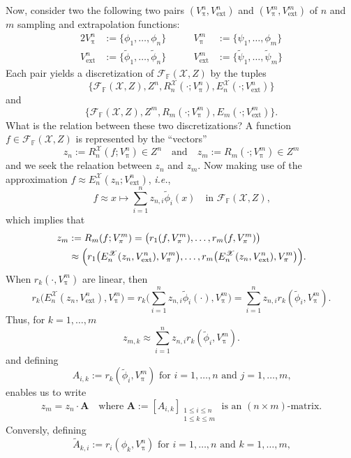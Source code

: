\documentclass[a4paper]{paper}
\newcommand{\VecSpace}[1]{\mathscr{#1}}
\newcommand{\Field}{\mathbb{F}}
\newcommand*{\EXT}[2]{\ensuremath{E_{#1}^{#2}}}
\newcommand*{\REST}[2]{\ensuremath{R_{#1}^{#2}}}
\newcommand*{\RnX}{\ensuremath{\REST{n}{\VecSpace{X}}}}
\newcommand*{\EnX}{\ensuremath{\EXT{n}{\VecSpace{X}}}}
\DeclareMathOperator{\rest}{\pi}
\newcommand{\ie}{\textsl{i.e.}\xspace}
\newcommand{\vA}{\boldsymbol{A}}
\newcommand{\cF}{\mathcal{F}}
\newcommand{\ext}{\text{ext}}
\newcommand{\wt}[1]{\widetilde{#1}}
\begin{document}
Now, consider two the following two pairs $(V^n_{\rest},V^n_{\ext})$ and 
$(V^m_{\rest},V^m_{\ext})$ of $n$ and $m$ sampling and extrapolation 
functions:
\begin{alignat*}{2}
  V^n_{\rest} &:=\{ \phi_{1},\ldots,\phi_{n} \} &\qquad
  V^m_{\rest} &:=\{ \psi_{1},\ldots,\phi_{m} \}  \\
  V^n_{\ext} &:=\{ \wt{\phi}_{1},\ldots,\wt{\phi}_{n} \} &\qquad
  V^m_{\ext} &:=\{ \wt{\psi}_{1},\ldots,\wt{\psi}_{m} \}    
\end{alignat*}
Each pair yields a discretization of $\cF_{\Field}(\VecSpace{X},Z)$ by the tuples
\[ 
   \bigl\{
     \cF_{\Field}(\VecSpace{X},Z),Z^n,\RnX(\cdot;V^n_{\rest}),\EnX(\cdot;V^n_{\ext})
   \bigr\} \]
and
\[ \bigl\{
     \cF_{\Field}(\VecSpace{X},Z),Z^m,R_{m}(\cdot;V^m_{\rest}),E_{m}(\cdot;V^m_{\ext})
   \bigr\}. \] 
What is the relation between these two discretizations? A function 
$f\in \cF_{\Field}(\VecSpace{X},Z)$ is represented by the ``vectors'' 
\[ z_{n}:= \RnX(f;V^n_{\rest})\in Z^n \quad\text{and}\quad
   z_{m}:= R_{m}(\cdot;V^m_{\rest})\in Z^m \]
and we seek the relaation between $z_{n}$ and $z_{m}$. 
Now making use of the approximation $f\approx 
\EnX(z_{n};V^n_{\ext})$, \ie,
\[ f \approx x \mapsto 
       \sum_{i=1}^n z_{n,i} \wt{\phi}_{i}(x)
   \quad\text{in $\cF_{\Field}(\VecSpace{X},Z)$,} 
\]
which implies that
\begin{align*}
  z_{m} &:=R_{m}(f;V^m_{\rest}) =
    \bigl( r_{1}(f,V^m_{\rest}),\ldots,r_{m}(f,V^m_{\rest}) \bigr) \\
    &\approx 
      \Bigl( r_{1}\bigl(\EnX(z_{n},V^n_{\ext}),V^m_{\rest}\bigr),
             \ldots,
	     r_{m}\bigl(\EnX(z_{n},V^n_{\ext}),V^m_{\rest}\bigr)
      \Bigr).
\end{align*}
When $r_{k}(\cdot,V^m_{\rest})$ are linear, then 
\[ r_{k}\bigl(\EnX(z_{n},V^n_{\ext}),V^m_{\rest}\bigr)=
     r_{k}\biggl(\sum_{i=1}^n 
       z_{n,i}\wt{\phi}_{i}(\cdot),V^m_{\rest}\biggr)=
     \sum_{i=1}^n z_{n,i} r_{k}(\wt{\phi}_{i},V^m_{\rest}).
\]   
Thus, for $k=1,\ldots,m$
\[
  z_{m,k}\approx 
    \sum_{i=1}^n z_{n,i} r_{k}(\wt{\phi}_{i},V^m_{\rest}).
\]    
and defining 
\[ A_{i,k}:= r_{k}(\wt{\phi}_{i},V^m_{\rest})
   \text{ for $i=1,\ldots,n$ and $j=1,\ldots,m$,} \]
enables us to write
\[ z_{m}=z_{n}\cdot\vA
   \quad\text{where } 
   \vA:=[ A_{i,k} ]_{\substack{1\leq i \leq n \\ 1\leq k \leq m}}
   \text{ is an $(n\times m)$-matrix.} \]
Conversly, defining 
\[ \wt{A}_{k,i}:=r_{i}(\phi_{k},V^n_{\rest})
   \text{ for $i=1,\ldots,n$ and $k=1,\ldots,m$,} \]
\end{document}
